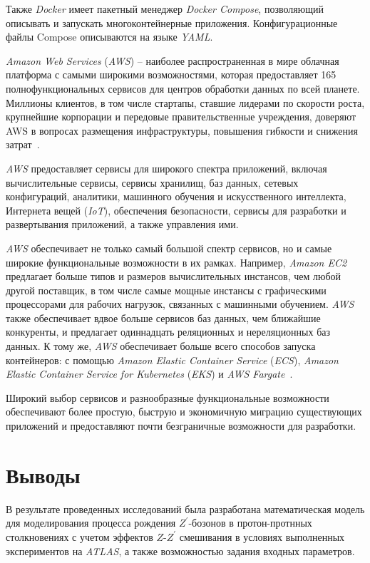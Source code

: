 Также \textit{Docker} имеет пакетный менеджер \textit{Docker Compose}, позволяющий описывать и запускать многоконтейнерные приложения. Конфигурационные файлы Compose описываются на языке \textit{YAML}.

\textit{Amazon Web Services} (\textit{AWS}) – наиболее распространенная в мире облачная платформа с самыми широкими возможностями, которая предоставляет 165 полнофункциональных сервисов для центров обработки данных по всей планете. Миллионы клиентов, в том числе стартапы, ставшие лидерами по скорости роста, крупнейшие корпорации и передовые правительственные учреждения, доверяют AWS в вопросах размещения инфраструктуры, повышения гибкости и снижения затрат~\cite{aws}.

\textit{AWS} предоставляет сервисы для широкого спектра приложений, включая вычислительные сервисы, сервисы хранилищ, баз данных, сетевых конфигураций, аналитики, машинного обучения и искусственного интеллекта, Интернета вещей (\textit{IoT}), обеспечения безопасности, сервисы для разработки и развертывания приложений, а также управления ими.

\textit{AWS} обеспечивает не только самый большой спектр сервисов, но и самые широкие функциональные возможности в их рамках. Например, \textit{Amazon EC2} предлагает больше типов и размеров вычислительных инстансов, чем любой другой поставщик, в том числе самые мощные инстансы с графическими процессорами для рабочих нагрузок, связанных с машинными обучением. \textit{AWS} также обеспечивает вдвое больше сервисов баз данных, чем ближайшие конкуренты, и предлагает одиннадцать реляционных и нереляционных баз данных. К тому же, \textit{AWS} обеспечивает больше всего способов запуска контейнеров: с помощью \textit{Amazon Elastic Container Service} (\textit{ECS}), \textit{Amazon Elastic Container Service for Kubernetes} (\textit{EKS}) и \textit{AWS Fargate}~\cite{aws}.

Широкий выбор сервисов и разнообразные функциональные возможности обеспечивают более простую, быструю и экономичную миграцию существующих приложений и предоставляют почти безграничные возможности для разработки.


\section{Выводы}

В результате проведенных исследований была разработана
математическая модель для моделирования процесса рождения ${Z}^{\prime}$-бозонов в протон-протнных столкновениях с учетом эффектов $Z$-${Z}^{\prime}$ смешивания в условиях выполненных экспериментов на \textit{ATLAS}, а также
возможностью задания входных параметров.